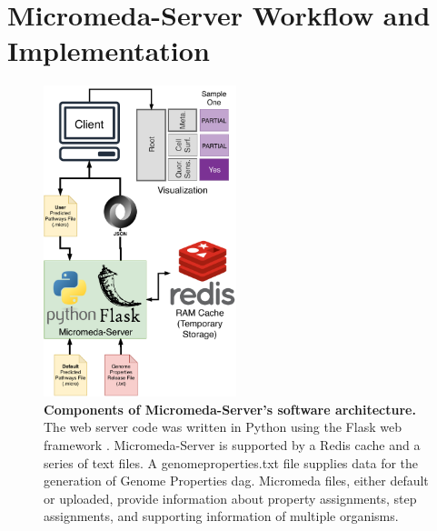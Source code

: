 \section{Micromeda-Server Workflow and Implementation} \label{server-workflow}

\begin{figure}[!ht]
  \centering
	\includegraphics[width=0.50\textwidth]{media/Micromeda-Server.pdf}
	 \caption[Components of Micromeda-Server's software 
architecture.]{\textbf{Components of Micromeda-Server's software architecture.} 
The web server code was written in Python using the Flask web framework 
\cite{grinberg2018flask}. Micromeda-Server is supported by a Redis cache and a 
series of text files. A genomeproperties.txt file supplies data for the 
generation of Genome Properties \gls{dag}. Micromeda files, either default or 
uploaded, provide information about property assignments, step assignments, and 
supporting information of multiple organisms.}
	 \label{fig:micromeda-server}
\end{figure}

